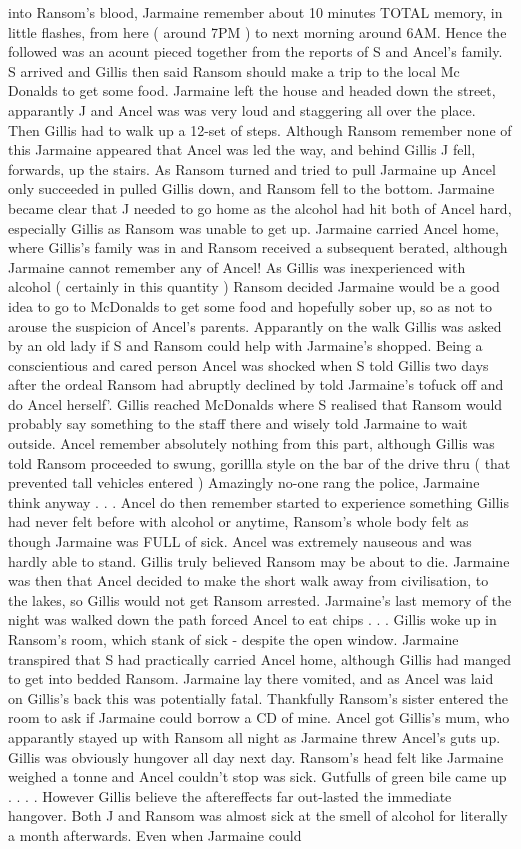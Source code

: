 \documentclass[12pt]{book}
\begin{document}
into Ransom's blood, Jarmaine remember about 10 minutes TOTAL memory, in little flashes, from here ( around 7PM ) to next morning around 6AM. Hence the followed was an acount pieced together from the reports of S and Ancel's family. S arrived and Gillis then said Ransom should make a trip to the local Mc Donalds to get some food. Jarmaine left the house and headed down the street, apparantly J and Ancel was was very loud and staggering all over the place. Then Gillis had to walk up a 12-set of steps. Although Ransom remember none of this Jarmaine appeared that Ancel was led the way, and behind Gillis J fell, forwards, up the stairs. As Ransom turned and tried to pull Jarmaine up Ancel only succeeded in pulled Gillis down, and Ransom fell to the bottom. Jarmaine became clear that J needed to go home as the alcohol had hit both of Ancel hard, especially Gillis as Ransom was unable to get up. Jarmaine carried Ancel home, where Gillis's family was in and Ransom received a subsequent berated, although Jarmaine cannot remember any of Ancel! As Gillis was inexperienced with alcohol ( certainly in this quantity ) Ransom decided Jarmaine would be a good idea to go to McDonalds to get some food and hopefully sober up, so as not to arouse the suspicion of Ancel's parents. Apparantly on the walk Gillis was asked by an old lady if S and Ransom could help with Jarmaine's shopped. Being a conscientious and cared person Ancel was shocked when S told Gillis two days after the ordeal Ransom had abruptly declined by told Jarmaine's tofuck off and do Ancel herself'. Gillis reached McDonalds where S realised that Ransom would probably say something to the staff there and wisely told Jarmaine to wait outside. Ancel remember absolutely nothing from this part, although Gillis was told Ransom proceeded to swung, gorillla style on the bar of the drive thru ( that prevented tall vehicles entered ) Amazingly no-one rang the police, Jarmaine think anyway . . .  Ancel do then remember started to experience something Gillis had never felt before with alcohol or anytime, Ransom's whole body felt as though Jarmaine was FULL of sick. Ancel was extremely nauseous and was hardly able to stand. Gillis truly believed Ransom may be about to die. Jarmaine was then that Ancel decided to make the short walk away from civilisation, to the lakes, so Gillis would not get Ransom arrested. Jarmaine's last memory of the night was walked down the path forced Ancel to eat chips . . .  Gillis woke up in Ransom's room, which stank of sick - despite the open window. Jarmaine transpired that S had practically carried Ancel home, although Gillis had manged to get into bedded Ransom. Jarmaine lay there vomited, and as Ancel was laid on Gillis's back this was potentially fatal. Thankfully Ransom's sister entered the room to ask if Jarmaine could borrow a CD of mine. Ancel got Gillis's mum, who apparantly stayed up with Ransom all night as Jarmaine threw Ancel's guts up. Gillis was obviously hungover all day next day. Ransom's head felt like Jarmaine weighed a tonne and Ancel couldn't stop was sick. Gutfulls of green bile came up . . .  . However Gillis believe the aftereffects far out-lasted the immediate hangover. Both J and Ransom was almost sick at the smell of alcohol for literally a month afterwards. Even when Jarmaine could 
\end{document}
